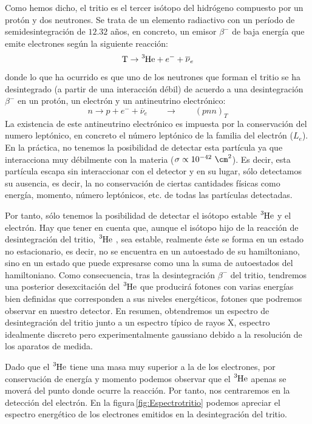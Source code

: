 Como hemos dicho, el tritio es el tercer isótopo del hidrógeno compuesto por un protón y dos neutrones. Se trata de un elemento radiactivo con un período de semidesintegración de $12.32$ años, en concreto, un emisor $\beta^-$ de baja energía que emite electrones según la siguiente reacción:
\begin{equation}
\ce{T} \rightarrow \ce{^{3}He} + e^- + \overline{\nu}_e
\label{desintegraciontritio}
\end{equation}
donde lo que ha ocurrido es que uno de los neutrones que forman el tritio se ha desintegrado (a partir de una interacción débil) de acuerdo a una desintegración $\beta^-$ en un protón, un electrón y un antineutrino electrónico:
\begin{equation}
n \rightarrow p + e^- + \overline{\nu}_e \qquad \rightarrow \qquad (pnn)_T
\label{desintegracionbeta}
\end{equation}
La existencia de este antineutrino electrónico es impuesta por la conservación del numero leptónico, en concreto el número leptónico de la familia del electrón ($L_e$). En la práctica, no tenemos la posibilidad de detectar esta partícula ya que interacciona muy débilmente con la materia ($\sigma \propto 10^{-42}~\cm^2$).  Es decir, esta partícula escapa sin interaccionar con el detector y en su lugar, sólo detectamos su ausencia, es decir, la no conservación de ciertas cantidades físicas como energía, momento, número leptónicos, etc. de todas  las partículas detectadas.

Por tanto, sólo tenemos la posibilidad de detectar el isótopo estable $\ce{^3He}$  y el electrón. Hay que tener en cuenta que, aunque el isótopo hijo de la reacción de desintegración del tritio, $\ce{^3He}$ , sea estable, realmente éste se forma en un estado no estacionario, es decir, no se encuentra en un autoestado de su hamiltoniano, sino en un estado que puede expresarse como una la suma de autoestados del hamiltoniano. Como consecuencia, tras la desintegración $\beta^-$ del tritio, tendremos una posterior desexcitación del $\ce{^3He}$ que producirá fotones con varias energías bien definidas que corresponden a sus niveles energéticos, fotones que podremos observar en nuestro detector. En resumen, obtendremos un espectro de desintegración del tritio junto a un espectro típico de rayos X, espectro idealmente discreto pero experimentalmente gaussiano debido a la resolución  de los aparatos de medida.

Dado que el $\ce{^3He}$  tiene una masa muy superior a la de los electrones, por conservación de energía y momento podemos observar que el $\ce{^3He}$  apenas se moverá del punto donde ocurre la reacción. Por tanto, nos centraremos en la detección del electrón. En la figura\,\ref{fig:Espectrotritio} podemos apreciar el espectro energético de los electrones emitidos en la desintegración del tritio.

